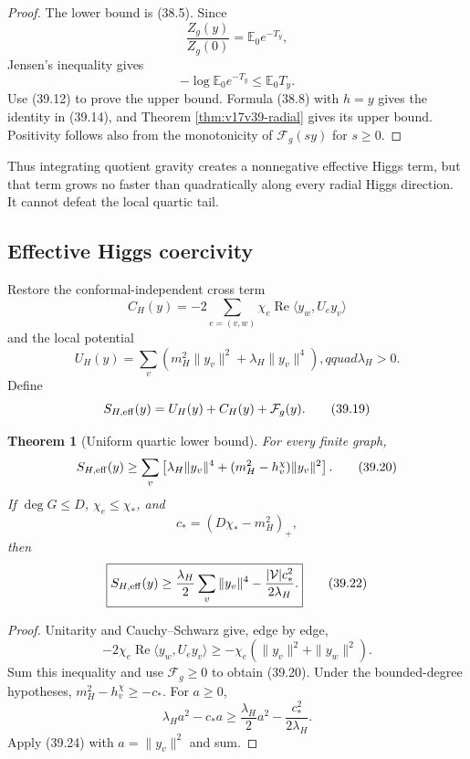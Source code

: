 \documentclass[11pt]{article}
\newtheorem{theorem}{Theorem}[section]
\theoremstyle{remark}
\begin{document}
\begin{proof}
The lower bound is (38.5).  Since
\[
 \frac{Z_g(y)}{Z_g(0)}=\mathbb E_0e^{-T_y},        \tag{39.15}
\]
Jensen's inequality gives
\[
 -\log\mathbb E_0e^{-T_y}\leq\mathbb E_0T_y.      \tag{39.16}
\]
Use (39.12) to prove the upper bound.  Formula (38.8) with \(h=y\)
gives the identity in (39.14), and Theorem
\ref{thm:v17v39-radial} gives its upper bound.  Positivity follows
also from the monotonicity of
\(\mathcal F_g(sy)\) for \(s\geq0\).
\end{proof}

Thus integrating quotient gravity creates a nonnegative effective
Higgs term, but that term grows no faster than quadratically along every
radial Higgs direction.  It cannot defeat the local quartic tail.

\subsection{Effective Higgs coercivity}

Restore the conformal-independent cross term
\[
 C_H(y)=-2\sum_{e=(v,w)}\chi_e
 \operatorname{Re}\langle y_w,U_ey_v\rangle       \tag{39.17}
\]
and the local potential
\[
 U_H(y)=\sum_v\left(m_H^2\|y_v\|^2
 +\lambda_H\|y_v\|^4\right),qquad\lambda_H>0.   \tag{39.18}
\]
Define
\[
 S_{H,\rm eff}(y)=U_H(y)+C_H(y)+\mathcal F_g(y).   \tag{39.19}
\]

\begin{theorem}[Uniform quartic lower bound]
\label{thm:v17v39-coercive}
For every finite graph,
\[
 S_{H,\rm eff}(y)
 \geq\sum_v\left[
 \lambda_H\|y_v\|^4+(m_H^2-h_v^\chi)\|y_v\|^2
 \right].                                         \tag{39.20}
\]
If \(\deg G\leq D\), \(\chi_e\leq\chi_*\), and
\[
 c_*=(D\chi_*-m_H^2)_+,                            \tag{39.21}
\]
then
\[
\boxed{
 S_{H,\rm eff}(y)
 \geq\frac{\lambda_H}{2}\sum_v\|y_v\|^4
 -\frac{|\mathcal V|c_*^2}{2\lambda_H}.}          \tag{39.22}
\]
\end{theorem}

\begin{proof}
Unitarity and Cauchy--Schwarz give, edge by edge,
\[
 -2\chi_e\operatorname{Re}\langle y_w,U_ey_v\rangle
 \geq-\chi_e(\|y_v\|^2+\|y_w\|^2).               \tag{39.23}
\]
Sum this inequality and use \(\mathcal F_g\geq0\) to obtain (39.20).
Under the bounded-degree hypotheses,
\(m_H^2-h_v^\chi\geq-c_*\).  For \(a\geq0\),
\[
 \lambda_Ha^2-c_*a
 \geq\frac{\lambda_H}{2}a^2
 -\frac{c_*^2}{2\lambda_H}.                       \tag{39.24}
\]
Apply (39.24) with \(a=\|y_v\|^2\) and sum.
\end{proof}
\end{document}
